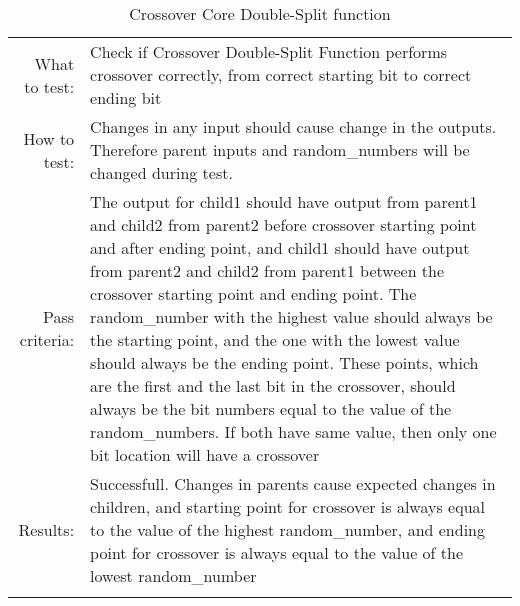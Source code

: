 \begin{table}[H]
  \begin{tabular}{r | p{9cm}}
    \noalign{\smallskip}\hline\noalign{\smallskip}
    
    What to test:  & Check if Crossover Double-Split Function performs crossover
                     correctly, from correct starting bit to correct ending bit \\

    \noalign{\smallskip}\hline\noalign{\smallskip}

    How to test:   &    Changes in any input should cause change in the outputs.
                        Therefore parent inputs and random\_numbers will be changed
                        during test.  
                        \\
                      
    \noalign{\smallskip}\hline\noalign{\smallskip}

    Pass criteria: &    The output for child1 should have output from parent1 and child2
                        from parent2 before crossover starting point and after ending 
                        point, and child1 should have output from parent2 and child2
                        from parent1 between the crossover starting point and ending
                        point. 
                        The random\_number with the highest value should always be the 
                        starting point, and the one with the lowest value should always
                        be the ending point. 
                        These points, which are the first and the last bit in the 
                        crossover, should always be the bit numbers equal to the value     
                        of the random\_numbers. 
                        If both have same value, then only one bit location will have a
                        crossover
                        \\
    \noalign{\smallskip}\hline\noalign{\smallskip}
    
    Results: &      Successfull. 
                    Changes in parents cause expected changes in children, and starting 
                    point for crossover is always equal to the value of the highest 
                    random\_number, and ending point for crossover is always equal to 
                    the value of the lowest random\_number
                    \\
   \noalign{\smallskip}\hline\noalign{\smallskip}
  
  
  
  \end{tabular}
  \caption{Crossover Core Double-Split function}
  \label{testing:components:genetic_pipeline:crossover_core_doublesplit}
\end{table}
